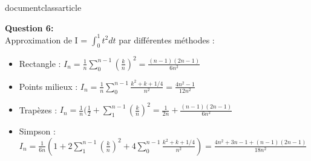 documentclass{article}
\usepackage{enumitem}

{\bfseries\large Question 6:}\\
Approximation de I = \(\int_{0}^{1}t^{2}dt\) par différentes méthodes :
\begin{itemize}
\item Rectangle : \(I_{n} = \frac{1}{n}\sum_{0}^{n-1}(\frac{k}{n})^{2}=\frac{(n-1)(2n-1)}{6n^{2}}\)
\item Points milieux : \(I_{n} = \frac{1}{n}\sum_{0}^{n-1}\frac{k^{2}+k+1/4}{n^{2}}=\frac{4n^{2}-1}{12n^{2}}\)
\item Trapèzes : \(I_{n} = \frac{1}{n}(\frac{1}{2} + \sum_{1}^{n-1}(\frac{k}{n})^{2}=\frac{1}{2n}+\frac{(n-1)(2n-1)}{6n^{2}}\)
\item Simpson : \(I_{n} = \frac{1}{6n}(1+2\sum_{1}^{n-1}(\frac{k}{n})^{2}+4\sum_{0}^{n-1}\frac{k^{2}+k+1/4}{n^{2}})=\frac{4n^{2}+3n-1+(n-1)(2n-1)}{18n^{2}}\)
\end{itemize}




